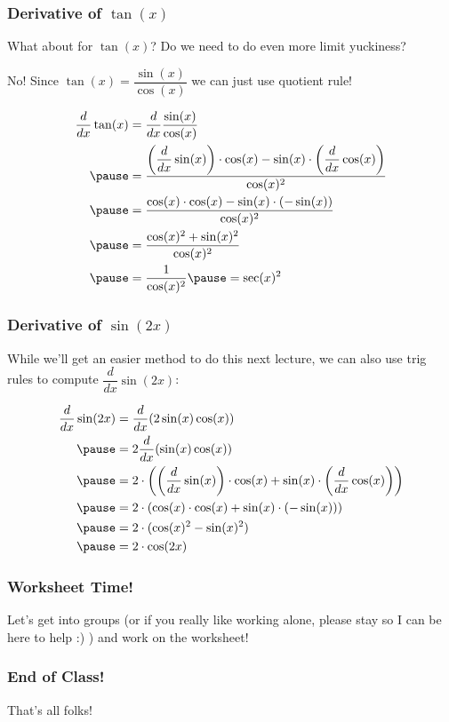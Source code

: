 \documentclass{ltx-talk}
\begin{document}
\begin{frame}
  \frametitle{Derivative of $\tan(x)$}
  What about for $\tan(x)$? Do we need to do even more limit yuckiness? \pause

  No! Since $\tan(x) = \dfrac{\sin(x)}{\cos(x)}$ we can just use quotient rule! \pause

  \begin{align}
    \dfrac{d}{dx} \tan(x) &= \dfrac{d}{dx} \dfrac{\sin(x)}{\cos(x)} \\ \pause
                          &= \dfrac{\left(\dfrac{d}{dx}\sin(x)\right)\cdot \cos(x) - \sin(x) \cdot \left(\dfrac{d}{dx} \cos(x)\right)}{\cos(x)^2} \\ \pause
                          &= \dfrac{\cos(x) \cdot \cos(x) - \sin(x) \cdot (- \sin(x))}{\cos(x)^2} \\ \pause
                          &= \dfrac{\cos(x)^2 + \sin(x)^2}{\cos(x)^2} \\ \pause
                          &= \dfrac{1}{\cos(x)^2} \pause = \sec(x)^2
  \end{align}
\end{frame}

\begin{frame}
  \frametitle{Derivative of $\sin(2x)$}

  While we'll get an easier method to do this next lecture, we can also use trig rules to compute $\dfrac{d}{dx} \sin(2x)$: \pause

  \begin{align}
    \dfrac{d}{dx} \sin(2x) &= \dfrac{d}{dx}(2 \sin(x) \cos(x)) \\ \pause
                           &= 2 \dfrac{d}{dx} (\sin(x) \cos(x)) \\ \pause
                           &= 2 \cdot \left( \left(\dfrac{d}{dx} \sin(x)\right) \cdot \cos(x) + \sin(x) \cdot \left( \dfrac{d}{dx} \cos(x)\right) \right) \\ \pause
                           &= 2 \cdot (\cos(x) \cdot \cos(x) + \sin(x) \cdot (- \sin(x))) \\ \pause
                           &= 2 \cdot (\cos(x)^2 - \sin(x)^2) \\ \pause
                           &= 2 \cdot \cos(2x)
  \end{align}
\end{frame}

\begin{frame}
  \frametitle{Worksheet Time!}

  Let's get into groups (or if you really like working alone, please stay so I can be here to help :) ) and work on the worksheet!
\end{frame}

\begin{frame}
  \frametitle{End of Class!}

  That's all folks!
\end{frame}
\end{document}
